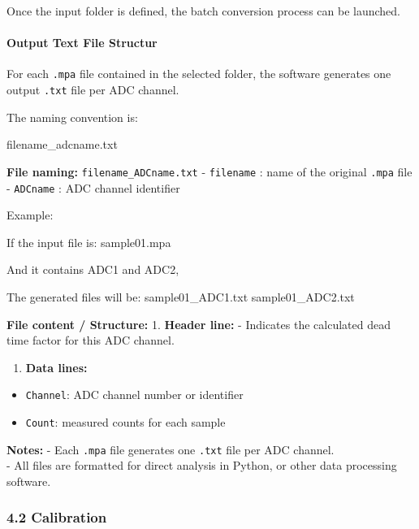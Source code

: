 Once the input folder is defined, the batch conversion process can be
launched.

\hypertarget{output-text-file-structur}{%
\paragraph{Output Text File Structur}\label{output-text-file-structur}}

For each \texttt{.mpa} file contained in the selected folder, the
software generates one output \texttt{.txt} file per ADC channel.

The naming convention is:

filename\_adcname.txt

\textbf{File naming:} \texttt{filename\_ADCname.txt} - \texttt{filename}
: name of the original \texttt{.mpa} file - \texttt{ADCname} : ADC
channel identifier

Example:

If the input file is: sample01.mpa

And it contains ADC1 and ADC2,

The generated files will be: sample01\_ADC1.txt sample01\_ADC2.txt

\textbf{File content / Structure:} 1. \textbf{Header line:} - Indicates
the calculated dead time factor for this ADC channel.

\begin{enumerate}
\def\labelenumi{\arabic{enumi}.}
\setcounter{enumi}{1}
\tightlist
\item
  \textbf{Data lines:}\\
\end{enumerate}

\begin{itemize}
\tightlist
\item
  \texttt{Channel}: ADC channel number or identifier\\
\item
  \texttt{Count}: measured counts for each sample
\end{itemize}

\textbf{Notes:} - Each \texttt{.mpa} file generates one \texttt{.txt}
file per ADC channel.\\
- All files are formatted for direct analysis in Python, or other data
processing software.

\hypertarget{calibration}{%
\subsubsection{4.2 Calibration}\label{calibration}}

